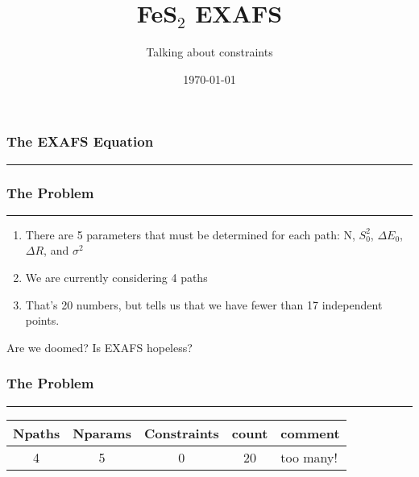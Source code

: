 \documentclass[10pt, xcolor=x11names, compress]{beamer}
\title{FeS$_2$ EXAFS}%
\subtitle{Talking about constraints}
\date{\today}
\begin{document}
\maketitle

\begin{frame}
  \frametitle{The EXAFS Equation}
  \exafsequation

  \smallskip

  \par\noindent\rule{\textwidth}{0.4pt}

  \begin{overlayarea}{\linewidth}{0.5\textheight} 
  \end{overlayarea}
\end{frame}

\begin{frame}
  \frametitle{The Problem}
  \exafsequation

  \smallskip

  \par\noindent\rule{\textwidth}{0.4pt}

  \begin{overlayarea}{\linewidth}{0.5\textheight} 
    \begin{enumerate}
    \item There are 5 parameters that must be determined for each
      path: {\color{Red4} N}, {\color{Red4} $S_0^2$},
      {\color{Red4} $\Delta E_0$}, {\color{Red4} $\Delta R$}, and
      {\color{Red4} $\sigma^2$}
    \item We are currently considering 4 paths
    \item That's 20 numbers, but \artemis tells us that we have
      fewer than 17 independent points.
    \end{enumerate}
    \begin{alertblock}{}
      \begin{center}
        Are we doomed?  Is EXAFS hopeless?
      \end{center}
    \end{alertblock}
  \end{overlayarea}
\end{frame}


\begin{frame}
  \frametitle{The Problem}
  \exafsequation

  \smallskip

  \par\noindent\rule{\textwidth}{0.4pt}
  
  \begin{overlayarea}{\linewidth}{0.5\textheight} 
    \begin{center}
      \begin{tabular}{ccccl}
        Npaths & Nparams & Constraints & count & comment \\
        \hline
        4 & 5 & 0 & 20 & too many!\\
        \hline
      \end{tabular}
    \end{center}
  \end{overlayarea}
\end{frame}
\end{document}
